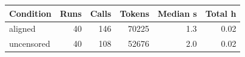 \begin{tabular}{lrrrrr}
\toprule
Condition & Runs & Calls & Tokens & Median s & Total h \\
\midrule
aligned & 40 & 146 & 70225 & 1.3 & 0.02 \\
uncensored & 40 & 108 & 52676 & 2.0 & 0.02 \\
\bottomrule
\end{tabular}
